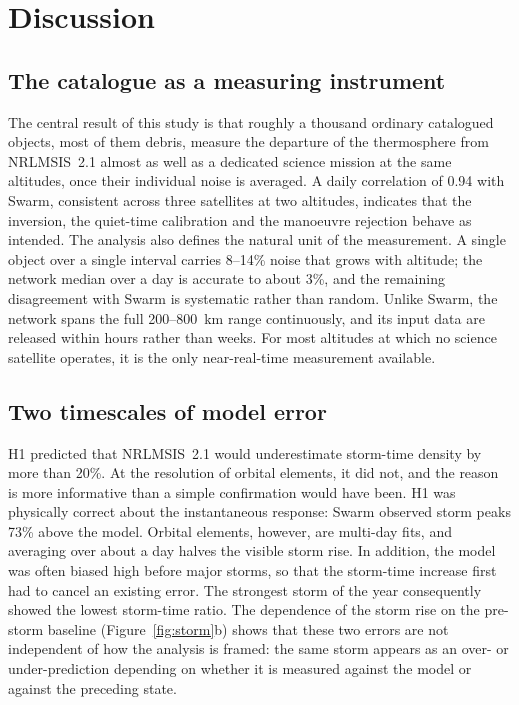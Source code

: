\documentclass[11pt]{article}
\begin{document}
\section{Discussion}

\subsection{The catalogue as a measuring instrument}
The central result of this study is that roughly a thousand ordinary catalogued objects, most of them debris, measure the departure of the thermosphere from NRLMSIS~2.1 almost as well as a dedicated science mission at the same altitudes, once their individual noise is averaged. A daily correlation of 0.94 with Swarm, consistent across three satellites at two altitudes, indicates that the inversion, the quiet-time calibration and the manoeuvre rejection behave as intended. The analysis also defines the natural unit of the measurement. A single object over a single interval carries 8--14\% noise that grows with altitude; the network median over a day is accurate to about 3\%, and the remaining disagreement with Swarm is systematic rather than random. Unlike Swarm, the network spans the full 200--800~km range continuously, and its input data are released within hours rather than weeks. For most altitudes at which no science satellite operates, it is the only near-real-time measurement available.

\subsection{Two timescales of model error}\label{sec:twotime}
H1 predicted that NRLMSIS~2.1 would underestimate storm-time density by more than 20\%. At the resolution of orbital elements, it did not, and the reason is more informative than a simple confirmation would have been. H1 was physically correct about the instantaneous response: Swarm observed storm peaks 73\% above the model. Orbital elements, however, are multi-day fits, and averaging over about a day halves the visible storm rise. In addition, the model was often biased high before major storms, so that the storm-time increase first had to cancel an existing error. The strongest storm of the year consequently showed the lowest storm-time ratio. The dependence of the storm rise on the pre-storm baseline (Figure~\ref{fig:storm}b) shows that these two errors are not independent of how the analysis is framed: the same storm appears as an over- or under-prediction depending on whether it is measured against the model or against the preceding state.
\end{document}
